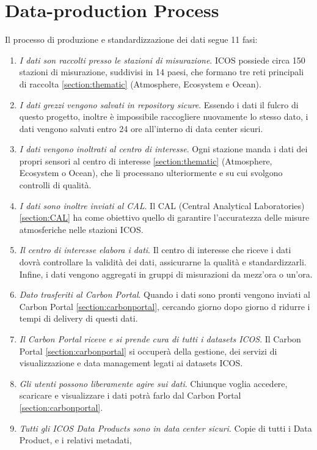 \section{Data-production Process}
Il processo di produzione e standardizzazione dei dati segue 11 fasi:
\begin{enumerate}
    \item \textit{I dati son raccolti presso le stazioni di misurazione}.
    ICOS possiede circa 150 stazioni di misurazione, suddivisi in 14 paesi,
    che formano tre reti principali di raccolta \ref{section:thematic} (Atmosphere, Ecosystem e Ocean).
    \item \textit{I dati grezzi vengono salvati in repository sicure}.
    Essendo i dati il fulcro di questo progetto, inoltre è impossibile raccogliere nuovamente
    lo stesso dato, i dati vengono salvati entro 24 ore all'interno di
    data center sicuri.
    \item \textit{I dati vengono inoltrati al centro di interesse}. Ogni stazione manda i dati dei propri sensori al centro di interesse \ref{section:thematic}
    (Atmosphere, Ecosystem o Ocean), che li processano ulteriormente e su cui svolgono controlli di qualità.
    \item \textit{I dati sono inoltre inviati al CAL}. Il CAL (Central Analytical Laboratories) \ref{section:CAL}
     ha come obiettivo quello di garantire
    l'accuratezza delle misure atmosferiche nelle stazioni ICOS.
    \item \textit{Il centro di interesse elabora i dati}. Il centro di interesse che riceve i dati dovrà controllare la validità dei dati, assicurarne la qualità e
    standardizzarli. Infine, i dati vengono aggregati in gruppi di misurazioni da mezz'ora o un'ora.
    \item \textit{Dato trasferiti al Carbon Portal}. Quando i dati sono pronti vengono inviati al Carbon Portal \ref{section:carbonportal}, 
    cercando giorno dopo giorno d ridurre i tempi di delivery di questi dati.
    \item \textit{Il Carbon Portal riceve e si prende cura di tutti i datasets ICOS}. Il Carbon Portal \ref{section:carbonportal} si occuperà della gestione, dei servizi di visualizzazione e data management legati ai datasets ICOS.
    \item \textit{Gli utenti possono liberamente agire sui dati}. Chiunque voglia accedere, scaricare e visualizzare i dati potrà farlo dal Carbon Portal \ref{section:carbonportal}.
    \item \textit{Tutti gli ICOS Data Products sono in data center sicuri}. Copie di tutti i Data Product, e i relativi metadati,

\end{enumerate}
